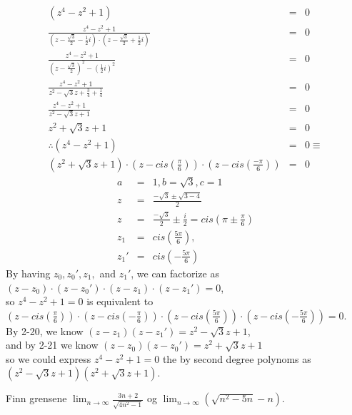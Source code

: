 \documentclass{myassignment}
\begin{document}
\begin{answer}
		\begin{eqnarray}
			(z^4 - z^2 + 1) &=&0 \\[2em]
			\frac{z^4 - z^2 + 1}{(z - \frac{\sqrt{3}}{2} - \frac {1}{2}i)\cdot(z - \frac{\sqrt{3}}{2} + \frac {1}{2}i)} &=& 0 \\[2em]
			\frac{z^4 - z^2 + 1}{(z - \frac{\sqrt{3}}{2})^2 - (\frac {1}{2}i)^2} &=& 0 \\[2em]
			\frac{z^4 - z^2 + 1}{z^2 - \sqrt{3}z + \frac{3}{4} + \frac {1}{4}} &=& 0 \\[2em]
			\frac{z^4 - z^2 + 1}{z^2 - \sqrt{3}z + 1} &=& 0 \\[2em]
			z^2+\sqrt{3}z+1 &=& 0 \\[2em]
			\therefore (z^4 - z^2 + 1)&=&0 \equiv \\
			(z^2+\sqrt{3}z+1)\cdot(z-cis(\frac{\pi}{6}))\cdot(z-cis(\frac{-\pi}{6})) &=&0
		\end{eqnarray}
		\begin{eqnarray}
			a &=& 1, b = \sqrt{3}, c = 1 \\[2em]
			z &=& \frac{-\sqrt{3}\pm\sqrt{3-4}}{2} \\[2em]
			z &=& \frac{-\sqrt{3}}{2}\pm\frac{i}{2} = cis(\pi\pm \frac{\pi}{6}) \\[2em]
			z_1 &=& cis(\frac{5\pi}{6}),\\
			z_1' &=& cis(-\frac{5\pi}{6})
		\end{eqnarray}
		By having $z_0, z_0', z_1,$ and $z_1'$, we can factorize as $(z-z_0)\cdot(z-z_0')\cdot(z-z_1)\cdot(z-z_1')=0$, \\[1em]
		so $z^4 - z^2 + 1=0$ is equivalent to $(z-cis(\frac{\pi}{6}))\cdot(z-cis(-\frac{\pi}{6}))\cdot(z-cis(\frac{5\pi}{6}))\cdot(z-cis(-\frac{5\pi}{6}))=0$. \\[1em]
		By 2-20, we know $(z-z_1)(z-z_1') = z^2 - \sqrt{3}z + 1$, \\[1em]
		and by 2-21 we know $(z-z_0)(z-z_0')=z^2+\sqrt{3}z+1$ \\[1em]
		so we could express $z^4 - z^2 + 1=0$ the by second degree polynoms as $(z^2 - \sqrt{3}z + 1)(z^2+\sqrt{3}z+1).$

	\end{answer}


	\pagebreak
	\begin{problem}
		Finn grensene $\lim_{n \rightarrow \infty}\frac{3n + 2}{\sqrt{4n^2 - 1}}$ og $\lim_{n\rightarrow\infty}(\sqrt{n^2 - 5n} - n)$.
	\end{problem}
\end{document}
